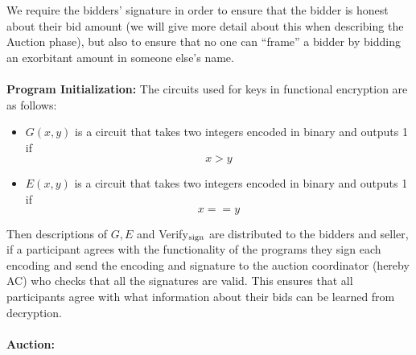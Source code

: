 \documentclass[12pt,twoside]{reedthesis}
\begin{document}
     \par We require the bidders' signature in order to ensure that the bidder is honest about their bid amount (we will give more detail about this when describing the Auction phase), but also to ensure that no one can ``frame'' a bidder by bidding an exorbitant amount in someone else's name.
%
%
%
    \\ \\ \textbf{Program Initialization:} The circuits used for keys in functional encryption are as follows:
    \begin{itemize}
    \item $G(x,y)$ is a circuit that takes two integers encoded in binary and outputs  1 if $$x>y$$
    \item $E(x,y)$ is a circuit that takes two integers encoded in binary and outputs 1 if $$
    x==y$$
    \end{itemize}
    Then descriptions of $G,E$ and Verify$_\text{sign}$ are distributed to the bidders and seller, if a participant agrees with the functionality of the programs they sign each encoding and send the encoding and signature to the auction coordinator (hereby AC) who checks that all the signatures are valid. This ensures that all participants agree with what information about their bids can be learned from decryption. \\
    \\
       \textbf{Auction:} 
       
\end{document}
